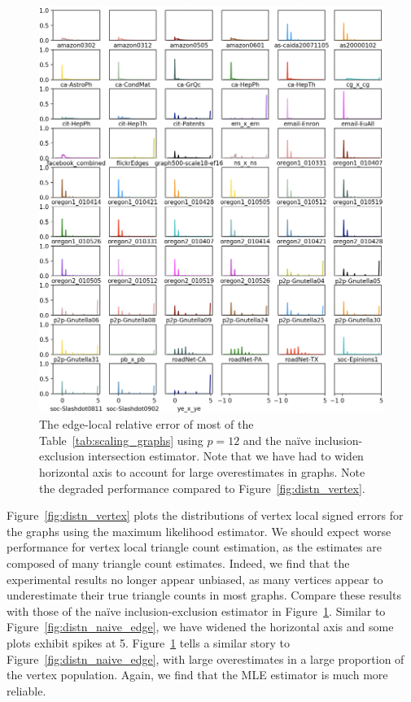 \documentclass[10]{article}
\begin{document}
\begin{figure}
	\centerline{\includegraphics[width=1.0\columnwidth]{distn_naive_vertex_total}}
	\caption{The edge-local relative error of most of the  Table~\ref{tab:scaling_graphs} using $p=12$ and the na\"ive inclusion-exclusion intersection estimator. 
	Note that we have had to widen horizontal axis to account for large overestimates in graphs. 
	Note the degraded performance compared to Figure~\ref{fig:distn_vertex}.
	\label{fig:distn_naive_vertex}}
\end{figure}


Figure~\ref{fig:distn_vertex} plots the distributions of vertex local signed errors for the graphs using the maximum likelihood estimator. 
We should expect worse performance for vertex local triangle count estimation, as the estimates are composed of many triangle count estimates.
Indeed, we find that the experimental results no longer appear unbiased, as many vertices appear to underestimate their true triangle counts in most graphs. 
Compare these results with those of the na\"ive inclusion-exclusion estimator in Figure~\ref{fig:distn_naive_vertex}.
Similar to Figure~\ref{fig:distn_naive_edge}, we have widened the horizontal axis and some plots exhibit spikes at 5.
Figure~\ref{fig:distn_naive_vertex} tells a similar story to Figure~\ref{fig:distn_naive_edge}, with large overestimates in a large proportion of the vertex population.
Again, we find that the MLE estimator is much more reliable.
\end{document}
